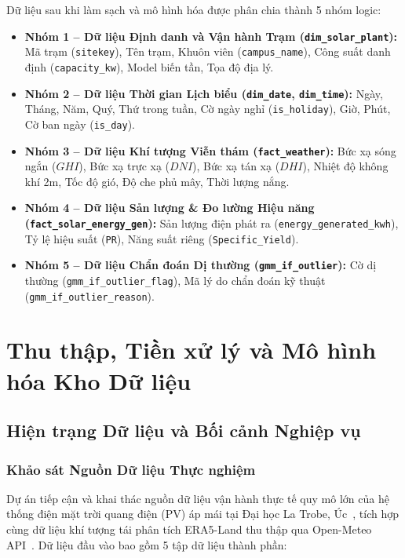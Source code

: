 \documentclass[12pt, a4paper]{report}
\begin{document}
Dữ liệu sau khi làm sạch và mô hình hóa được phân chia thành 5 nhóm logic:
\begin{itemize}[noitemsep]
    \item \textbf{Nhóm 1 -- Dữ liệu Định danh và Vận hành Trạm (\texttt{dim\_solar\_plant}):} Mã trạm (\texttt{sitekey}), Tên trạm, Khuôn viên (\texttt{campus\_name}), Công suất danh định (\texttt{capacity\_kw}), Model biến tần, Tọa độ địa lý.
    \item \textbf{Nhóm 2 -- Dữ liệu Thời gian Lịch biểu (\texttt{dim\_date}, \texttt{dim\_time}):} Ngày, Tháng, Năm, Quý, Thứ trong tuần, Cờ ngày nghỉ (\texttt{is\_holiday}), Giờ, Phút, Cờ ban ngày (\texttt{is\_day}).
    \item \textbf{Nhóm 3 -- Dữ liệu Khí tượng Viễn thám (\texttt{fact\_weather}):} Bức xạ sóng ngắn ($GHI$), Bức xạ trực xạ ($DNI$), Bức xạ tán xạ ($DHI$), Nhiệt độ không khí 2m, Tốc độ gió, Độ che phủ mây, Thời lượng nắng.
    \item \textbf{Nhóm 4 -- Dữ liệu Sản lượng \& Đo lường Hiệu năng (\texttt{fact\_solar\_energy\_gen}):} Sản lượng điện phát ra (\texttt{energy\_generated\_kwh}), Tỷ lệ hiệu suất (\texttt{PR}), Năng suất riêng (\texttt{Specific\_Yield}).
    \item \textbf{Nhóm 5 -- Dữ liệu Chẩn đoán Dị thường (\texttt{gmm\_if\_outlier}):} Cờ dị thường (\texttt{gmm\_if\_outlier\_flag}), Mã lý do chẩn đoán kỹ thuật (\texttt{gmm\_if\_outlier\_reason}).
\end{itemize}

\newpage
\chapter{Thu thập, Tiền xử lý và Mô hình hóa Kho Dữ liệu}
\label{chap:etl_modeling}

\section{Hiện trạng Dữ liệu và Bối cảnh Nghiệp vụ}
\label{sec:data_landscape}

\subsection{Khảo sát Nguồn Dữ liệu Thực nghiệm}

Dự án tiếp cận và khai thác nguồn dữ liệu vận hành thực tế quy mô lớn của hệ thống điện mặt trời quang điện (PV) áp mái tại Đại học La Trobe, Úc~\cite{wimalaratne2022unisolar}, tích hợp cùng dữ liệu khí tượng tái phân tích ERA5-Land thu thập qua Open-Meteo API~\cite{openmeteo2023}. Dữ liệu đầu vào bao gồm 5 tập dữ liệu thành phần:
\end{document}
